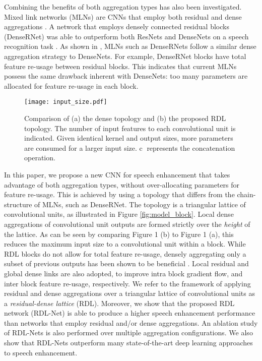 \documentclass[letterpaper]{article} \usepackage{aaai20}  \usepackage{times}  \usepackage{helvet} \usepackage{courier}  \usepackage[hyphens]{url}  \usepackage{graphicx} \urlstyle{rm} \def\UrlFont{\rm}  \usepackage{graphicx}  \frenchspacing  \setlength{\pdfpagewidth}{8.5in}  \setlength{\pdfpageheight}{11in}
\begin{document}
Combining the benefits of both aggregation types has also been investigated. Mixed link networks (MLNs) are CNNs that employ both residual and dense aggregations \cite{MLN}. A network that employs densely connected residual blocks (DenseRNet) was able to outperform both ResNets and DenseNets on a speech recognition task \cite{DenseRNet}. As shown in \cite{MLN}, MLNs such as DenseRNets follow a similar dense aggregation strategy to DenseNets. For example, DenseRNet blocks have total feature re-usage between residual blocks. This indicates that current MLNs possess the same drawback inherent with DenseNets: too many parameters are allocated for feature re-usage in each block.
\begin{figure}[htp]
\centering
	\centering
	\texttt{[image: input\_size.pdf]}\caption{Comparison of (a) the dense topology and (b) the proposed RDL topology. The number of input features to each convolutional unit is indicated. Given identical kernel and output sizes, more parameters are consumed for a larger input size. \textcircled{c} represents the concatenation operation.}
	\label{fig:res_dense_block}
\end{figure}
In this paper, we propose a new CNN for speech enhancement that takes advantage of both aggregation types, without over-allocating parameters for feature re-usage. This is achieved by using a topology that differs from the chain-structure of MLNs, such as DenseRNet. The topology is a triangular lattice of convolutional units, as illustrated in Figure \ref{fig:model_block}. Local dense aggregations of convolutional unit outputs are formed strictly over the \textit{height} of the lattice. As can be seen by comparing Figure 1 (b) to Figure 1 (a), this reduces the maximum input size to a convolutional unit within a block. While RDL blocks do not allow for total feature re-usage, densely aggregating only a subset of previous outputs has been shown to be beneficial \cite{sparse_aggCNN}. Local residual and global dense links are also adopted, to improve intra block gradient flow, and inter block feature re-usage, respectively. We refer to the framework of applying residual and dense aggregations over a triangular lattice of convolutional units as a {\it residual-dense lattice} (RDL). Moreover, we show that the proposed RDL network (RDL-Net) is able to produce a higher speech enhancement performance than networks that employ residual and/or dense aggregations. An ablation study of RDL-Nets is also performed over multiple aggregation configurations. We also show that RDL-Nets outperform many state-of-the-art deep learning approaches to speech enhancement.
\end{document}
